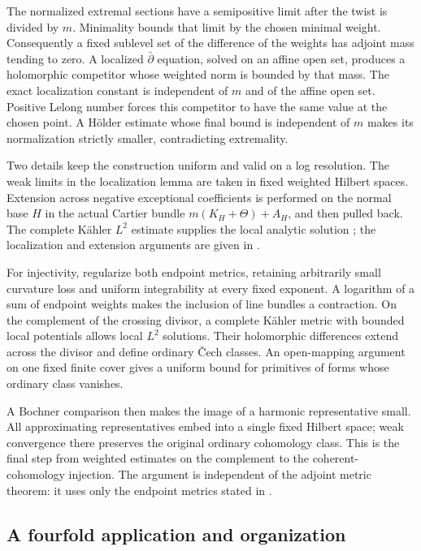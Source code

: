 The normalized extremal sections have a semipositive limit after the
twist is divided by $m$. Minimality bounds that limit by the chosen
minimal weight. Consequently a fixed sublevel set of the difference
of the weights has adjoint mass tending to zero. A localized
$\bar\partial$ equation, solved on an affine open set, produces a
holomorphic competitor whose weighted norm is bounded by that mass.
The exact localization constant is independent of $m$ and of the
affine open set. Positive Lelong number forces this competitor to have
the same value at the chosen point. A H\"older estimate whose final bound is independent of $m$ makes
its normalization strictly smaller, contradicting extremality.

Two details keep the construction uniform and valid on a log resolution.
The weak limits in the localization lemma are taken in fixed weighted
Hilbert spaces. Extension across negative exceptional coefficients is
performed on the normal base $H$ in the actual Cartier bundle
$m(K_H+\Theta)+A_H$, and then pulled back. The complete K\"ahler
$L^2$ estimate supplies the local analytic solution
\cite[Theorem~5.1]{Demailly2012}; the localization and extension
arguments are given in .

For injectivity, regularize both endpoint metrics, retaining arbitrarily
small curvature loss and uniform integrability at every fixed exponent.
A logarithm of a sum of endpoint weights makes the inclusion of line
bundles a contraction. On the complement of the crossing divisor,
a complete K\"ahler metric with bounded local potentials allows
local $L^2$ solutions. Their holomorphic differences extend across the
divisor and define ordinary \v Cech classes. An open-mapping argument
on one fixed finite cover gives a uniform bound for primitives of
forms whose ordinary class vanishes.

A Bochner comparison then makes the image of a harmonic representative
small. All approximating representatives embed into a single fixed
Hilbert space; weak convergence there preserves the original ordinary
cohomology class. This is the final step from weighted estimates on the
complement to the coherent-cohomology injection. The argument is
independent of the adjoint metric theorem: it uses only the endpoint
metrics stated in .

\subsection{A fourfold application and organization}

